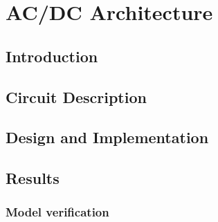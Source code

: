 \chapter{AC/DC Architecture}
\section{Introduction}
\section{Circuit Description}
\section{Design and Implementation}
\section{Results}
\subsection{Model verification}